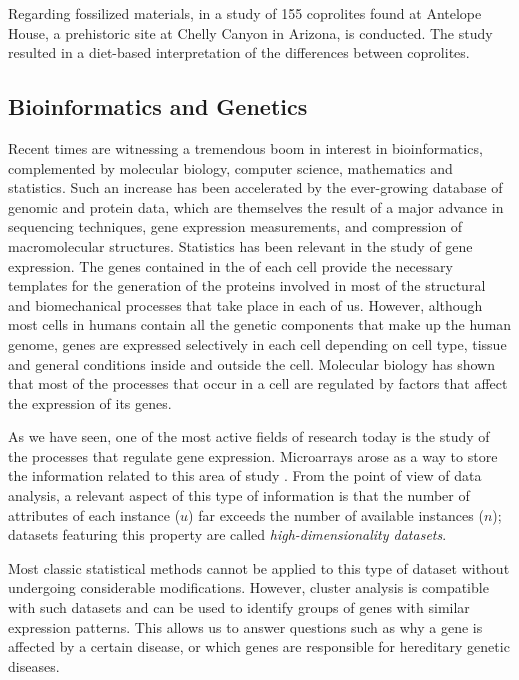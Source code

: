 Regarding fossilized materials, in \cite{sutton1995cluster} a study of 155 coprolites found at Antelope House, a prehistoric site at Chelly Canyon in Arizona, is conducted. The study resulted in a diet-based interpretation of the differences between coprolites.

\subsection{Bioinformatics and Genetics}

Recent times are witnessing a tremendous boom in interest in bioinformatics, complemented by molecular biology, computer science, mathematics and statistics. Such an increase has been accelerated by the ever-growing database of genomic and protein data, which are themselves the result of a major advance in  sequencing techniques, gene expression measurements, and compression of macromolecular structures. Statistics has been relevant in the study of gene expression. The genes contained in the  of each cell provide the necessary templates for the generation of the proteins involved in most of the structural and biomechanical processes that take place in each of us. However, although most cells in humans contain all the genetic components that make up the human genome, genes are expressed selectively in each cell depending on cell type, tissue and general conditions inside and outside the cell. Molecular biology has shown that most of the processes that occur in a cell are regulated by factors that affect the expression of its genes.

As we have seen, one of the most active fields of research today is the study of the processes that regulate gene expression. Microarrays arose as a way to store the information related to this area of study \cite{cortese2000array}. From the point of view of data analysis, a relevant aspect of this type of information is that the number of attributes of each instance ($u$) far exceeds the number of available instances ($n$); datasets featuring this property are called \textit{high-dimensionality datasets}.

Most classic statistical methods cannot be applied to this type of dataset without undergoing considerable modifications. However, cluster analysis is compatible with such datasets and can be used to identify groups of genes with similar expression patterns. This allows us to answer questions such as why a gene is affected by a certain disease, or which genes are responsible for hereditary genetic diseases.

